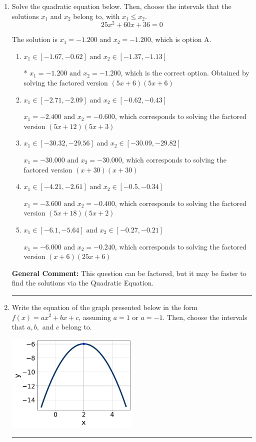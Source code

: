 \documentclass{extbook}[14pt]
\newcommand{\litem}[1]{\item #1

\rule{\textwidth}{0.4pt}}
\begin{document}
\begin{enumerate}\litem{
Solve the quadratic equation below. Then, choose the intervals that the solutions $x_1$ and $x_2$ belong to, with $x_1 \leq x_2$.
\[ 25x^{2} +60 x + 36 = 0 \]

The solution is \( x_1 = -1.200 \text{ and } x_2 = -1.200 \), which is option A.\begin{enumerate}[label=\Alph*.]
\item \( x_1 \in [-1.67, -0.62] \text{ and } x_2 \in [-1.37, -1.13] \)

* $x_1 = -1.200 \text{ and } x_2 = -1.200$, which is the correct option. Obtained by solving the factored version $(5x + 6)(5x + 6)$
\item \( x_1 \in [-2.71, -2.09] \text{ and } x_2 \in [-0.62, -0.43] \)

$x_1 = -2.400 \text{ and } x_2 = -0.600$, which corresponds to solving the factored version $(5x + 12)(5x + 3)$
\item \( x_1 \in [-30.32, -29.56] \text{ and } x_2 \in [-30.09, -29.82] \)

$x_1 = -30.000 \text{ and } x_2 = -30.000$, which corresponds to solving the factored version $(x + 30)(x + 30)$
\item \( x_1 \in [-4.21, -2.61] \text{ and } x_2 \in [-0.5, -0.34] \)

$x_1 = -3.600 \text{ and } x_2 = -0.400$, which corresponds to solving the factored version $(5x + 18)(5x + 2)$
\item \( x_1 \in [-6.1, -5.64] \text{ and } x_2 \in [-0.27, -0.21] \)

$x_1 = -6.000 \text{ and } x_2 = -0.240$, which corresponds to solving the factored version $(x + 6)(25x + 6)$
\end{enumerate}

\textbf{General Comment:} This question can be factored, but it may be faster to find the solutions via the Quadratic Equation.
}
\litem{
Write the equation of the graph presented below in the form $f(x)=ax^2+bx+c$, assuming  $a=1$ or $a=-1$. Then, choose the intervals that $a, b,$ and $c$ belong to.

\begin{center}
    \includegraphics[width=0.5\textwidth]{../Figures/quadraticGraphToEquationA.png}
\end{center}




}
\end{enumerate}
\end{document}
